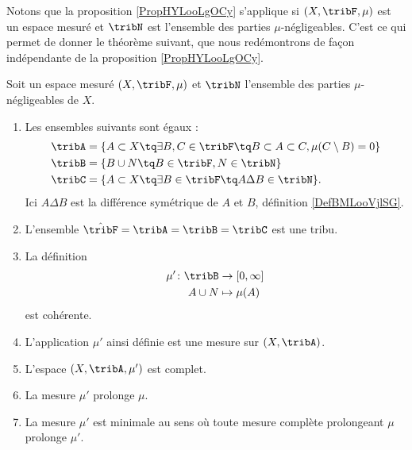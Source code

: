 Notons que la proposition \ref{PropHYLooLgOCy} s'applique si \( (X,\tribF,\mu)\) est un espace mesuré et \( \tribN\) est l'ensemble des parties \( \mu\)-négligeables. C'est ce qui permet de donner le théorème suivant, que nous redémontrons de façon indépendante de la proposition \ref{PropHYLooLgOCy}.
\begin{theorem}   \label{thoCRMootPojn}
    Soit un espace mesuré \( (X,\tribF,\mu)\) et \( \tribN\) l'ensemble des parties \( \mu\)-négligeables de \( X\).
    \begin{enumerate}
        \item
            Les ensembles suivants sont égaux :
            \begin{subequations}
                \begin{align}
                    \tribA&=\{ A\subset X\tq\exists B,C\in\tribF\tq B\subset A\subset C,\mu(C\setminus B)=0 \}\\
                    \tribB&=\{ B\cup N\tq  B\in\tribF,N\in\tribN \}    \label{EqFJIoorxZNU}\\
                    \tribC&=\{ A\subset X\tq \exists B\in\tribF\tq A\Delta B\in \tribN \}.
                \end{align}
            \end{subequations}
            Ici \( A\Delta B\) est la différence symétrique de \( A\) et \( B\), définition \ref{DefBMLooVjlSG}.
        \item
            L'ensemble \( \hat\tribF=\tribA=\tribB=\tribC\) est une tribu.
        \item
            La définition 
            \begin{equation}
                \begin{aligned}
                    \mu'\colon \tribB&\to \mathopen[ 0 , \infty \mathclose] \\
                    A\cup N&\mapsto \mu(A) 
                \end{aligned}
            \end{equation}
            est cohérente.
        \item
            L'application \( \mu'\) ainsi définie est une mesure sur \( (X,\tribA)\).
        \item
            L'espace \( (X,\tribA,\mu')\) est complet.
        \item
            La mesure \( \mu'\) prolonge \( \mu\).
        \item   \label{thoCRMootPojnvii}
            La mesure \( \mu'\) est minimale au sens où toute mesure complète prolongeant \( \mu\) prolonge \( \mu'\).
    \end{enumerate}
\end{theorem}

